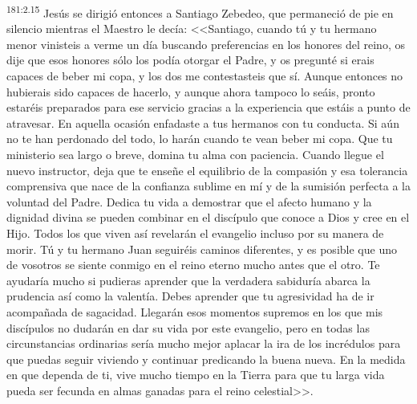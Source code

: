 \par 
\textsuperscript{181:2.15} Jesús se dirigió entonces a Santiago Zebedeo, que permaneció de pie en silencio mientras el Maestro le decía: <<Santiago, cuando tú y tu hermano menor vinisteis a verme un día buscando preferencias en los honores del reino, os dije que esos honores sólo los podía otorgar el Padre, y os pregunté si erais capaces de beber mi copa, y los dos me contestasteis que sí. Aunque entonces no hubierais sido capaces de hacerlo, y aunque ahora tampoco lo seáis, pronto estaréis preparados para ese servicio gracias a la experiencia que estáis a punto de atravesar. En aquella ocasión enfadaste a tus hermanos con tu conducta. Si aún no te han perdonado del todo, lo harán cuando te vean beber mi copa. Que tu ministerio sea largo o breve, domina tu alma con paciencia. Cuando llegue el nuevo instructor, deja que te enseñe el equilibrio de la compasión y esa tolerancia comprensiva que nace de la confianza sublime en mí y de la sumisión perfecta a la voluntad del Padre. Dedica tu vida a demostrar que el afecto humano y la dignidad divina se pueden combinar en el discípulo que conoce a Dios y cree en el Hijo. Todos los que viven así revelarán el evangelio incluso por su manera de morir. Tú y tu hermano Juan seguiréis caminos diferentes, y es posible que uno de vosotros se siente conmigo en el reino eterno mucho antes que el otro. Te ayudaría mucho si pudieras aprender que la verdadera sabiduría abarca la prudencia así como la valentía. Debes aprender que tu agresividad ha de ir acompañada de sagacidad. Llegarán esos momentos supremos en los que mis discípulos no dudarán en dar su vida por este evangelio, pero en todas las circunstancias ordinarias sería mucho mejor aplacar la ira de los incrédulos para que puedas seguir viviendo y continuar predicando la buena nueva. En la medida en que dependa de ti, vive mucho tiempo en la Tierra para que tu larga vida pueda ser fecunda en almas ganadas para el reino celestial>>.

